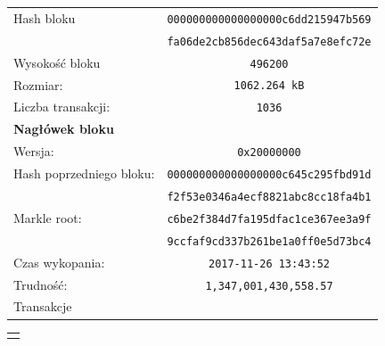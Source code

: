 \documentclass[12pt, oneside, final, openany]{mgr}
\begin{document}
\begin{figure}[H]
	\begin{center}	
	\begin{tabular}{ | l  c | }
		\hline    
     	Hash bloku & \texttt{000000000000000000c6dd215947b569} \\
    			    & \texttt{fa06de2cb856dec643daf5a7e8efc72e} \\ 
    	Wysokość bloku & \texttt{496200} \\
    	Rozmiar: & \texttt{1062.264 kB} \\
		Liczba transakcji: & \texttt{1036}\\ \hline
		\textbf{Nagłówek bloku} & \\
   	 	Wersja: & \texttt{0x20000000} \\   	 
   	 	Hash poprzedniego bloku: & \texttt{000000000000000000c645c295fbd91d}\\
   	 							 & \texttt{f2f53e0346a4ecf8821abc8cc18fa4b1}\\
		Markle root: 			 & \texttt{c6be2f384d7fa195dfac1ce367ee3a9f}\\
								 & \texttt{9ccfaf9cd337b261be1a0ff0e5d73bc4}\\
   		Czas wykopania: & \texttt{2017-11-26 13:43:52}\\
   		Trudność: & \texttt{1,347,001,430,558.57}\\
   		\hline
   		Transakcje &\\
   		\hline 
 	\end{tabular}
 	\end{center}

	\begin{center}
	\begin{tabular}{c}
		\big\Downarrow
	\end{tabular}
	\end{center} 	


\end{figure}
\end{document}
